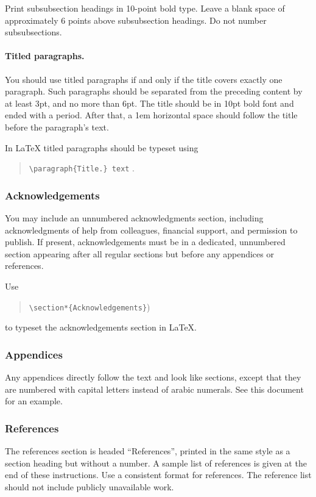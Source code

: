 \documentclass{article}
\begin{document}
Print subsubsection headings in 10-point bold type. Leave a blank
space of approximately 6 points above subsubsection headings. Do not
number subsubsections.

\paragraph{Titled paragraphs.} You should use titled paragraphs if and
only if the title covers exactly one paragraph. Such paragraphs should be
separated from the preceding content by at least 3pt, and no more than
6pt. The title should be in 10pt bold font and ended with a period.
After that, a 1em horizontal space should follow the title before
the paragraph's text.

In \LaTeX{} titled paragraphs should be typeset using
\begin{quote}
{\tt \textbackslash{}paragraph\{Title.\} text} .
\end{quote}

\subsubsection{Acknowledgements}

You may include an unnumbered acknowledgments section, including
acknowledgments of help from colleagues, financial support, and
permission to publish. If present, acknowledgements must be in a dedicated,
unnumbered section appearing after all regular sections but before any
appendices or references.

Use
\begin{quote}
    {\tt \textbackslash{}section*\{Acknowledgements\}})
\end{quote}
to typeset the acknowledgements section in \LaTeX{}.

\subsubsection{Appendices}

Any appendices directly follow the text and look like sections, except
that they are numbered with capital letters instead of arabic
numerals. See this document for an example.

\subsubsection{References}

The references section is headed ``References'', printed in the same
style as a section heading but without a number. A sample list of
references is given at the end of these instructions. Use a consistent
format for references. The reference list should not include publicly unavailable work.
\end{document}
